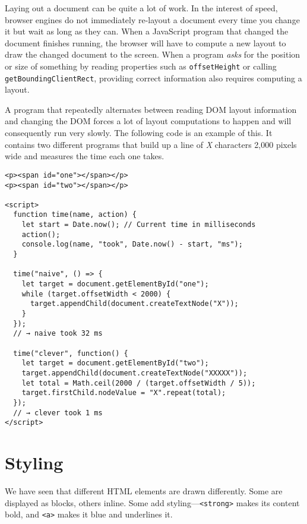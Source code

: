 Laying out a document can be quite a lot of work. In the interest of speed, browser engines do not immediately re-layout a document every time you change it but wait as long as they can. When a JavaScript program that changed the document finishes running, the browser will have to compute a new layout to draw the changed document to the screen. When a program \emph{asks} for the position or size of something by reading properties such as \lstinline`offsetHeight` or calling \lstinline`getBoundingClientRect`, providing correct information also requires computing a layout.

A program that repeatedly alternates between reading DOM layout information and changing the DOM forces a lot of layout computations to happen and will consequently run very slowly. The following code is an example of this. It contains two different programs that build up a line of \emph{X} characters 2,000 pixels wide and measures the time each one takes.

\begin{lstlisting}
<p><span id="one"></span></p>
<p><span id="two"></span></p>

<script>
  function time(name, action) {
    let start = Date.now(); // Current time in milliseconds
    action();
    console.log(name, "took", Date.now() - start, "ms");
  }

  time("naive", () => {
    let target = document.getElementById("one");
    while (target.offsetWidth < 2000) {
      target.appendChild(document.createTextNode("X"));
    }
  });
  // → naive took 32 ms

  time("clever", function() {
    let target = document.getElementById("two");
    target.appendChild(document.createTextNode("XXXXX"));
    let total = Math.ceil(2000 / (target.offsetWidth / 5));
    target.firstChild.nodeValue = "X".repeat(total);
  });
  // → clever took 1 ms
</script>
\end{lstlisting}
\noindent

\section{Styling}

We have seen that different HTML elements are drawn differently. Some are displayed as blocks, others inline. Some add styling—\lstinline`<strong>` makes its content bold, and \lstinline`<a>` makes it blue and underlines it.

